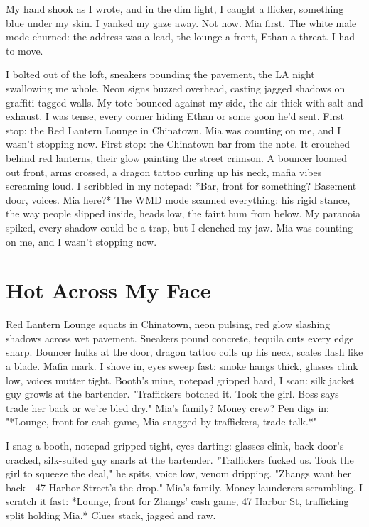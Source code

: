 \documentclass{article}
\begin{document}
My hand shook as I wrote, and in the dim light, I caught a flicker, something blue under my skin. I yanked my gaze away. Not now. Mia first. The white male mode churned: the address was a lead, the lounge a front, Ethan a threat. I had to move.

I bolted out of the loft, sneakers pounding the pavement, the LA night swallowing me whole. Neon signs buzzed overhead, casting jagged shadows on graffiti-tagged walls. My tote bounced against my side, the air thick with salt and exhaust. I was tense, every corner hiding Ethan or some goon he'd sent. First stop: the Red Lantern Lounge in Chinatown. Mia was counting on me, and I wasn't stopping now. First stop: the Chinatown bar from the note. It crouched behind red lanterns, their glow painting the street crimson. A bouncer loomed out front, arms crossed, a dragon tattoo curling up his neck, mafia vibes screaming loud. I scribbled in my notepad: *Bar, front for something? Basement door, voices. Mia here?* The WMD mode scanned everything: his rigid stance, the way people slipped inside, heads low, the faint hum from below. My paranoia spiked, every shadow could be a trap, but I clenched my jaw. Mia was counting on me, and I wasn't stopping now.

\section{Hot Across My Face}

Red Lantern Lounge squats in Chinatown, neon pulsing, red glow slashing shadows across wet pavement. Sneakers pound concrete, tequila cuts every edge sharp. Bouncer hulks at the door, dragon tattoo coils up his neck, scales flash like a blade. Mafia mark. I shove in, eyes sweep fast: smoke hangs thick, glasses clink low, voices mutter tight. Booth's mine, notepad gripped hard, I scan: silk jacket guy growls at the bartender. "Traffickers botched it. Took the girl. Boss says trade her back or we're bled dry." Mia's family? Money crew? Pen digs in: "*Lounge, front for cash game, Mia snagged by traffickers, trade talk.*"

I snag a booth, notepad gripped tight, eyes darting: glasses clink, back door's cracked, silk-suited guy snarls at the bartender. "Traffickers fucked us. Took the girl to squeeze the deal," he spits, voice low, venom dripping. "Zhangs want her back - 47 Harbor Street's the drop." Mia's family. Money launderers scrambling. I scratch it fast: *Lounge, front for Zhangs' cash game, 47 Harbor St, trafficking split holding Mia.* Clues stack, jagged and raw.
\end{document}
